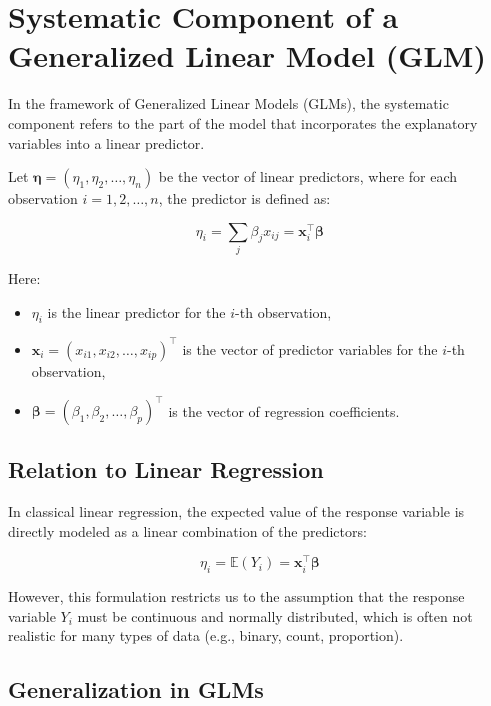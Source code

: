 \documentclass[12pt,a4paper]{article}
\begin{document}
\section*{Systematic Component of a Generalized Linear Model (GLM)}

In the framework of Generalized Linear Models (GLMs), the systematic component refers to the part of the model that incorporates the explanatory variables into a linear predictor.

\begin{definition}

Let \( \boldsymbol{\eta} = (\eta_1, \eta_2, \ldots, \eta_n) \) be the vector of linear predictors, where for each observation \( i = 1, 2, \ldots, n \), the predictor is defined as:

\[
\eta_i = \sum_{j} \beta_j x_{ij} = \mathbf{x}_i^\top \boldsymbol{\beta}
\]

Here:
\begin{itemize}
  \item \( \eta_i \) is the linear predictor for the \( i \)-th observation,
  \item \( \mathbf{x}_i = (x_{i1}, x_{i2}, \ldots, x_{ip})^\top \) is the vector of predictor variables for the \( i \)-th observation,
  \item \( \boldsymbol{\beta} = (\beta_1, \beta_2, \ldots, \beta_p)^\top \) is the vector of regression coefficients.
\end{itemize}

\end{definition}

\subsection*{Relation to Linear Regression}

In classical linear regression, the expected value of the response variable is directly modeled as a linear combination of the predictors:

\[
\eta_i = \mathbb{E}(Y_i) = \mathbf{x}_i^\top \boldsymbol{\beta}
\]

However, this formulation restricts us to the assumption that the response variable \( Y_i \) must be continuous and normally distributed, which is often not realistic for many types of data (e.g., binary, count, proportion).

\subsection*{Generalization in GLMs}
\end{document}
